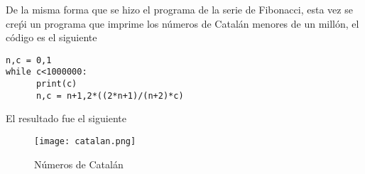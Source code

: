 \documentclass[a4 paper]{article}
\numberwithin{equation}{section}
\newcommand{\0}{\mathbf{0}}
\begin{document}
De la misma forma que se hizo el programa de la serie de Fibonacci, esta vez se cre\'pi un programa que imprime los n\'umeros de Catal\'an menores de un millón, el c\'odigo es el siguiente

\begin{verbatim}
n,c = 0,1
while c<1000000:
      print(c)
      n,c = n+1,2*((2*n+1)/(n+2)*c)
\end{verbatim}

El resultado fue el siguiente

\vspace{0.5cm}
\begin{figure}[!ht]
  \centering
      \texttt{[image: catalan.png]}
  \caption{N\'umeros de Catal\'an}
\end{figure}

\vspace{0.5cm}
\end{document}
